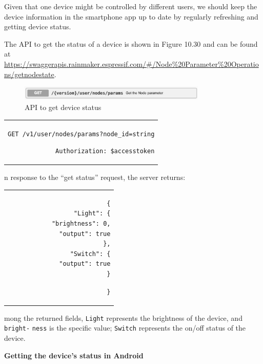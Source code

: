 \documentclass[a4paper,12pt,openany]{book}
\renewcommand{\ttfamily}{\fontfamily{pcr}\selectfont}
\renewcommand{\arraystretch}{1}
\newenvironment{codebloc}{ %
    \ttfamily\footnotesize
    \renewcommand{\arraystretch}{1}
}
\newcommand{\note}[2][NOTE]{ %
\vspace{6pt}
\begin{tabular}{b{\textwidth}}
\hline
\fontfamily{phv}\selectfont \textbf{#1}\\
\leftskip 1em #2\\
\hline
\end{tabular}
}
\begin{document}
Given that one device might be controlled by different users, we should keep the device information in the smartphone app up to date by regularly refreshing and getting device status.

The API to get the status of a device is shown in Figure 10.30 and can be found at \url{https://swaggerapis.rainmaker.espressif.com/\#/Node\%20Parameter\%20Operations/getnodestate}.

\begin{figure}[ht]
    \centering
    \includegraphics[width=0.8\textwidth]{D10Z/10-30}
    \caption{API to get device status}
\end{figure}

\begin{codebloc}
\begin{tabular}{d}
\verb|GET /v1/user/nodes/params?node_id=string|

\verb|Authorization: $accesstoken|
\end{tabular}
\end{codebloc}

In response to the “get status” request, the server returns:

\begin{codebloc}
\begin{tabular}{d}
\vspace{2pt}
\begin{verbatim}
{
        "Light": {
            "brightness": 0,
            "output": true
        },
        "Switch": {
            "output": true
        }
\end{verbatim}
\verb|}|
\end{tabular}
\end{codebloc}

Among the returned fields, \verb|Light| represents the brightness of the device, and \verb|bright-| \verb|ness| is the specific value; \verb|Switch| represents the on/off status of the device.

\textbf{Getting the device’s status in Android}

\end{document}
